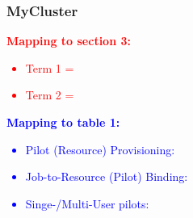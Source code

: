 \documentclass{sig-alternate}
\begin{document}

%
\subsubsection{MyCluster}

\textcolor{red}
{
\textbf{Mapping to section 3:}
\begin{itemize}
\item Term 1 =
\item Term 2 =
\end{itemize}
}

\textcolor{blue}
{
\textbf{Mapping to table 1:}
\begin{itemize}
\item Pilot (Resource) Provisioning:
\item Job-to-Resource (Pilot) Binding:
\item Singe-/Multi-User pilots:
\end{itemize}
}


\end{document}

